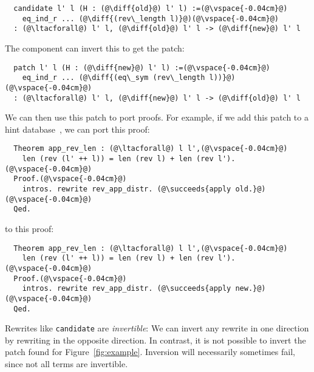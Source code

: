 \begin{lstlisting}
  candidate l' l (H : (@\diff{old}@) l' l) :=(@\vspace{-0.04cm}@)
    eq_ind_r ... (@\diff{(rev\_length l)}@)(@\vspace{-0.04cm}@)
  : (@\ltacforall@) l' l, (@\diff{old}@) l' l -> (@\diff{new}@) l' l
\end{lstlisting}
The component can invert this to get the patch: %

\begin{lstlisting}
  patch l' l (H : (@\diff{new}@) l' l) :=(@\vspace{-0.04cm}@)
    eq_ind_r ... (@\diff{(eq\_sym (rev\_length l))}@)(@\vspace{-0.04cm}@)
  : (@\ltacforall@) l' l, (@\diff{new}@) l' l -> (@\diff{old}@) l' l
\end{lstlisting}
We can then use this patch to port proofs.
For example, if we add this patch to a hint database~\cite{hints},
we can port this proof:

\begin{lstlisting}
  Theorem app_rev_len : (@\ltacforall@) l l',(@\vspace{-0.04cm}@)
    len (rev (l' ++ l)) = len (rev l) + len (rev l').(@\vspace{-0.04cm}@)
  Proof.(@\vspace{-0.04cm}@)
    intros. rewrite rev_app_distr. (@\succeeds{apply old.}@)(@\vspace{-0.04cm}@)
  Qed.
\end{lstlisting}
to this proof:

\begin{lstlisting}
  Theorem app_rev_len : (@\ltacforall@) l l',(@\vspace{-0.04cm}@)
    len (rev (l' ++ l)) = len (rev l) + len (rev l').(@\vspace{-0.04cm}@)
  Proof.(@\vspace{-0.04cm}@)
    intros. rewrite rev_app_distr. (@\succeeds{apply new.}@)(@\vspace{-0.04cm}@)
  Qed.
\end{lstlisting}

Rewrites like \lstinline{candidate} are \textit{invertible}:
We can invert any rewrite in one direction by rewriting in the opposite direction.
In contrast, it is not possible to invert the patch \sysname
found for Figure~\ref{fig:example}.
Inversion will necessarily sometimes fail, since not all terms are invertible.

